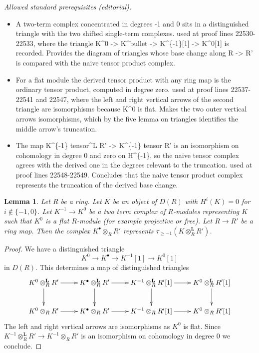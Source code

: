 \documentclass[10pt,a4paper]{amsart}
\theoremstyle{plain}
\newtheorem{lemma}[subsection]{Lemma}
\theoremstyle{definition}
\theoremstyle{remark}
\numberwithin{equation}{subsection}
\begin{document}
\noindent\textit{Allowed standard prerequisites (editorial).}\begin{itemize}
\item A two-term complex concentrated in degrees -1 and 0 sits in a distinguished triangle with the two shifted single-term complexes. used at proof lines 22530-22533, where the triangle K\textasciicircum{}0 -> K\textasciicircum{}bullet -> K\textasciicircum{}\{-1\}[1] -> K\textasciicircum{}0[1] is recorded. Provides the diagram of triangles whose base change along R -> R' is compared with the naive tensor product complex.
\item For a flat module the derived tensor product with any ring map is the ordinary tensor product, computed in degree zero. used at proof lines 22537-22541 and 22547, where the left and right vertical arrows of the second triangle are isomorphisms because K\textasciicircum{}0 is flat. Makes the two outer vertical arrows isomorphisms, which by the five lemma on triangles identifies the middle arrow's truncation.
\item The map K\textasciicircum{}\{-1\} tensor\textasciicircum{}L R' -> K\textasciicircum{}\{-1\} tensor R' is an isomorphism on cohomology in degree 0 and zero on H\textasciicircum{}\{-1\}, so the naive tensor complex agrees with the derived one in the degrees relevant to the truncation. used at proof lines 22548-22549. Concludes that the naive tensor product complex represents the truncation of the derived base change.
\end{itemize}\medskip
\begin{lemma}
\label{lemma-two-term-base-change}
Let $R$ be a ring. Let $K$ be an object of $D(R)$ with $H^i(K) = 0$
for $i \not \in \{-1, 0\}$. Let $K^{-1} \to K^0$ be a two term complex
of $R$-modules representing $K$ such that $K^0$ is a flat $R$-module
(for example projective or free). Let $R \to R'$ be a ring map.
Then the complex $K^\bullet \otimes_R R'$ represents
$\tau_{\geq -1}(K \otimes_R^\mathbf{L} R')$.
\end{lemma}

\begin{proof}
We have a distinguished triangle
$$
K^0 \to K^\bullet \to K^{-1}[1] \to K^0[1]
$$
in $D(R)$. This determines a map of distinguished triangles
$$
\xymatrix{
K^0 \otimes_R^\mathbf{L} R' \ar[d] \ar[r] &
K^\bullet \otimes_R^\mathbf{L} R' \ar[r] \ar[d] &
K^{-1} \otimes_R^\mathbf{L} R'[1] \ar[r] \ar[d] &
K^0 \otimes_R^\mathbf{L} R'[1] \ar[d] \\
K^0 \otimes_R R' \ar[r] &
K^\bullet \otimes_R R' \ar[r] &
K^{-1} \otimes_R R'[1] \ar[r] &
K^0 \otimes_R R'[1]
}
$$
The left and right vertical arrows are isomorphisms as $K^0$ is flat.
Since $K^{-1} \otimes_R^\mathbf{L} R' \to K^{-1} \otimes_R R'$
is an isomorphism on cohomology in degree $0$ we conclude.
\end{proof}
\end{document}
